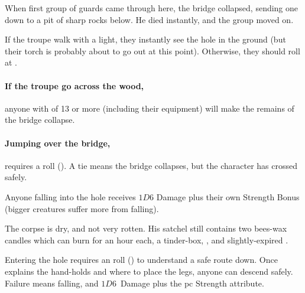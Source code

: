 \begin{multicols}{2}
\begin{exampletext}
  When first group of \glspl{guard} came through here, the bridge collapsed, sending one down to a pit of sharp rocks below.
  He died instantly, and the group moved on.
\end{exampletext}

If the troupe walk with a light, they instantly see the hole in the ground (but their torch is probably about to go out at this point).
Otherwise, they should roll  at \tn[8].

\paragraph{If the troupe go across the wood,}
anyone with  of 13 or more (including their \gls{equipment}) will make the remains of the bridge collapse.

\paragraph{Jumping over the bridge,}
requires a  roll (\tn[9]).
A tie means the bridge collapses, but the character has crossed safely.

Anyone falling into the hole receives $1D6$ Damage plus their own Strength Bonus (bigger creatures suffer more from falling).

The corpse is dry, and not very rotten.
His satchel still contains two bees-wax candles which can burn for an hour each, a tinder-box, \lootMedium, and slightly-expired \rations.
\label{caveCoinsI}
\setcounter{diceNo}{0}%
\renewcommand\npcsymbol{\currency}%



Entering the hole requires an  roll (\tn[7]) to understand a safe route down.
Once  explains the hand-holds and where to place the legs, anyone can descend safely.
Failure means falling, and $1D6$~Damage plus the \gls{pc} Strength \gls{attribute}.



\end{multicols}

